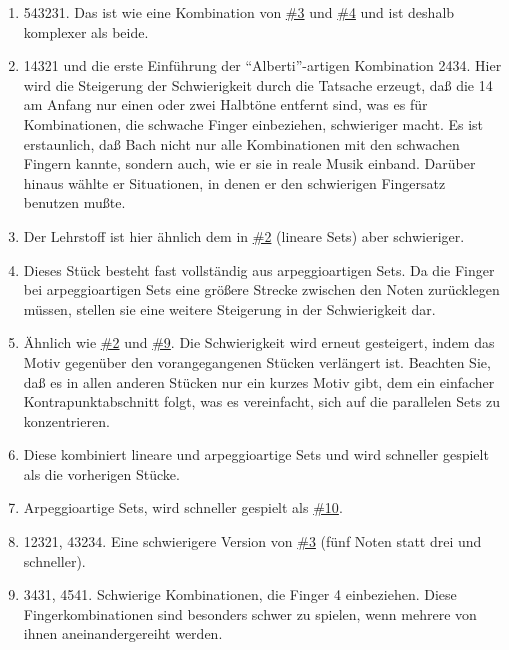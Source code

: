 \begin{enumerate}[label={\arabic*.}]
\item \label{c1iii20ps07}

543231.
Das ist wie eine Kombination von \hyperref[c1iii20ps03]{\#3} und \hyperref[c1iii20ps04]{\#4} und ist deshalb komplexer als beide.


\item \label{c1iii20ps08}

14321 und die erste Einführung der \enquote{Alberti}-artigen Kombination 2434.
Hier wird die Steigerung der Schwierigkeit durch die Tatsache erzeugt, daß die 14 am Anfang nur einen oder zwei Halbtöne entfernt sind, was es für Kombinationen, die schwache Finger einbeziehen, schwieriger macht.
Es ist erstaunlich, daß Bach nicht nur alle Kombinationen mit den schwachen Fingern kannte, sondern auch, wie er sie in reale Musik einband.
Darüber hinaus wählte er Situationen, in denen er den schwierigen Fingersatz benutzen mußte.


\item \label{c1iii20ps09}

Der Lehrstoff ist hier ähnlich dem in \hyperref[c1iii20ps02]{\#2} (lineare Sets) aber schwieriger.


\item \label{c1iii20ps10}

Dieses Stück besteht fast vollständig aus arpeggioartigen Sets.
Da die Finger bei arpeggioartigen Sets eine größere Strecke zwischen den Noten zurücklegen müssen, stellen sie eine weitere Steigerung in der Schwierigkeit dar.


\item \label{c1iii20ps11}

Ähnlich wie \hyperref[c1iii20ps02]{\#2} und \hyperref[c1iii20ps09]{\#9}.
Die Schwierigkeit wird erneut gesteigert, indem das Motiv gegenüber den vorangegangenen Stücken verlängert ist.
Beachten Sie, daß es in allen anderen Stücken nur ein kurzes Motiv gibt, dem ein einfacher Kontrapunktabschnitt folgt, was es vereinfacht, sich auf die parallelen Sets zu konzentrieren.


\item \label{c1iii20ps12}

Diese kombiniert lineare und arpeggioartige Sets und wird schneller gespielt als die vorherigen Stücke.


\item \label{c1iii20ps13}

Arpeggioartige Sets, wird schneller gespielt als \hyperref[c1iii20ps10]{\#10}.


\item \label{c1iii20ps14}

12321, 43234.
Eine schwierigere Version von \hyperref[c1iii20ps03]{\#3} (fünf Noten statt drei und schneller).


\item \label{c1iii20ps15}

3431, 4541.
Schwierige Kombinationen, die Finger 4 einbeziehen.
Diese Fingerkombinationen sind besonders schwer zu spielen, wenn mehrere von ihnen aneinandergereiht werden.
\end{enumerate}

